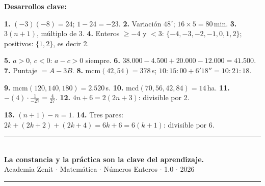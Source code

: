 \documentclass[11pt, letterpaper]{article}
\begin{document}
\medskip
\textbf{Desarrollos clave:}

\textbf{1.} $(-3)(-8)=24$; $1-24=-23$. \quad \textbf{2.} Variaci\'on $48^\circ$; $16\times 5=80$\,min. \quad \textbf{3.} $3(n+1)$, m\'ultiplo de 3. \quad \textbf{4.} Enteros $\geq -4$ y $<3$: $\{-4,-3,-2,-1,0,1,2\}$; positivos: $\{1,2\}$, es decir 2.

\textbf{5.} $a>0$, $c<0$: $a-c>0$ siempre. \quad \textbf{6.} $38.000-4.500+20.000-12.000=41.500$. \quad \textbf{7.} Puntaje $=A-3B$. \quad \textbf{8.} $\text{mcm}(42,54)=378$\,s; $10{:}15{:}00+6'18''=10{:}21{:}18$.

\textbf{9.} $\text{mcm}(120,140,180)=2.520$\,s. \quad \textbf{10.} $\text{mcd}(70,56,42,84)=14$\,ha. \quad \textbf{11.} $-(4)\cdot\frac{1}{-27}=\frac{4}{27}$. \quad \textbf{12.} $4n+6=2(2n+3)$: divisible por 2.

\textbf{13.} $(n+1)-n=1$. \quad \textbf{14.} Tres pares: $2k+(2k+2)+(2k+4)=6k+6=6(k+1)$: divisible por 6.

\vspace{8pt}
\begin{center}
  \rule{\linewidth}{1.5pt}\\[4pt]
  {\large\bfseries\color{zenitnavy} La constancia y la pr\'actica son la clave del aprendizaje.}\\[2pt]
  {\color{zenitgold}\small Academia Zenit $\cdot$ Matem\'atica $\cdot$ N\'umeros Enteros $\cdot$ 1.0 $\cdot$ 2026}
  \rule{\linewidth}{1.5pt}
\end{center}
\end{document}
